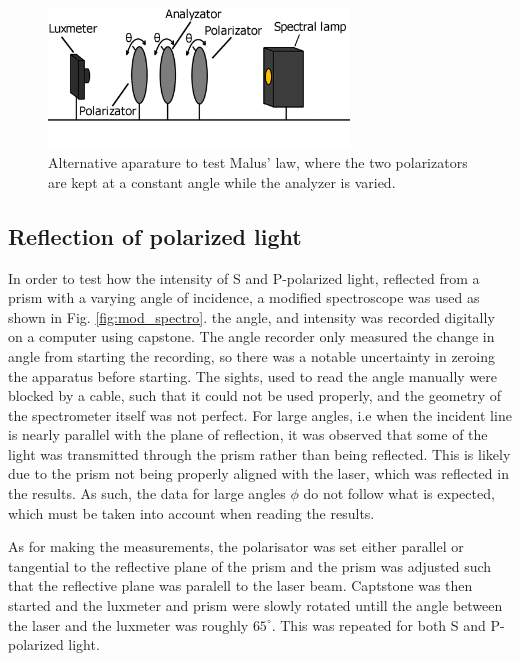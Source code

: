 \documentclass[11pt,a4paper,twocolumn]{article}
\begin{document}
    \begin{figure}[H]
      \center
      \includegraphics[width=8cm]{scripts/figs/diagram_3.png}
      \caption{Alternative aparature to test Malus' law, where the two polarizators are kept at a constant angle while the analyzer is varied.}
      \label{fig:lux_pola_ana_pola_lamp}
    \end{figure}

    \subsection{Reflection of polarized light}
      In order to test how the intensity of S and P-polarized light, reflected from a prism with a varying angle of incidence, a modified spectroscope was used as shown in Fig. \ref{fig:mod_spectro}. the angle, and intensity was recorded digitally on a computer using capstone. The angle recorder only measured the change in angle from starting the recording, so there was a notable uncertainty in zeroing the apparatus before starting. The sights, used to read the angle manually were blocked by a cable, such that it could not be used properly, and the geometry of the spectrometer itself was not perfect. For large angles, i.e when the incident line is nearly parallel with the plane of reflection, it was observed that some of the light was transmitted through the prism rather than being reflected. This is likely due to the prism not being properly aligned with the laser, which was reflected in the results. As such, the data for large angles $\phi$ do not follow what is expected, which must be taken into account when reading the results.

      As for making the measurements, the polarisator was set either parallel or tangential to the reflective plane of the prism and the prism was adjusted such that the reflective plane was paralell to the laser beam. Captstone was then started and the luxmeter and prism were slowly rotated untill the angle between the laser and the luxmeter was roughly $65^\circ$. This was repeated for both S and P-polarized light.
\end{document}
